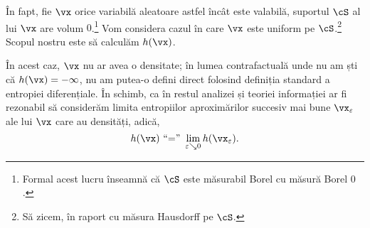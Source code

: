 \documentclass[../../book-main_ro.tex]{subfiles}
\begin{document}
În fapt, fie \(\vx\) orice variabilă aleatoare astfel încât  este valabilă, suportul \(\cS\) al lui \(\vx\) are volum \(0\).\footnote{Formal acest lucru înseamnă că \(\cS\) este măsurabil Borel cu măsură Borel \(0\).} Vom considera cazul în care \(\vx\) este uniform pe \(\cS\).\footnote{Să zicem, în raport cu măsura Hausdorff pe \(\cS\).} Scopul nostru este să calculăm \(h(\vx)\).

În acest caz, \(\vx\) nu ar avea o densitate; în lumea contrafactuală unde nu am ști că \(h(\vx) = -\infty\), nu am putea-o defini direct folosind definiția standard a entropiei diferențiale. În schimb, ca în restul analizei și teoriei informației ar fi rezonabil să considerăm limita entropiilor aproximărilor succesiv mai bune \(\vx_{\eps}\) ale lui \(\vx\) care au densități, adică,
\begin{equation}
    h(\vx)\ \text{``=''}\ \lim_{\eps \searrow 0}h(\vx_{\eps}).
\end{equation}
\end{document}
